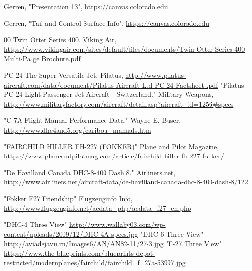 \documentclass[conf]{new-aiaa}
\begin{document}
\begin{thebibliography}{99}


 Gerren, "Presentation 13", \url{https://canvas.colorado.edu}

 Gerren, "Tail and Control Surface Info", \url{https://canvas.colorado.edu}

00%
 Twin Otter Series 400. Viking Air, 
    \url{https://www.vikingair.com/sites/default/files/documents/Twin Otter Series 400 Multi-Pa
ge Brochure.pdf}

 PC-24 The Super Versatile Jet. Pilatus, 
        \url{http://www.pilatus-aircraft.com/data/document/Pilatus-Aircraft-Ltd-PC-24-Factsheet
.pdf}
 "Pilatus PC-24 Light Passenger Jet Aircraft - Switzerland." Military Weapons, 
    \url{http://www.militaryfactory.com/aircraft/detail.asp?aircraft_id=1256#specs}

 "C-7A Flight Manual Performance Data." Wayne E. Buser, 
    \url{http://www.dhc4and5.org/caribou_manuals.htm}

 "FAIRCHILD HILLER FH-227 (FOKKER)" Plane and Pilot Magazine, 
    \url{https://www.planeandpilotmag.com/article/fairchild-hiller-fh-227-fokker/}

 "De Havilland Canada DHC-8-400 Dash 8." Airliners.net, 
    \url{http://www.airliners.net/aircraft-data/de-havilland-canada-dhc-8-400-dash-8/122}

 "Fokker F27 Friendship" Flugzeuginfo Info,
    \url{http://www.flugzeuginfo.net/acdata_php/acdata_f27_en.php}

 "DHC-4 Three View"
    \url{http://www.wallaby03.com/wp-content/uploads/2009/12/DHC-4A-specs.jpg}
 "DHC-6 Three View"
    \url{http://aviadejavu.ru/Images6/AN/AN82-11/27-3.jpg}
 "F-27 Three View"
    \url{https://www.the-blueprints.com/blueprints-depot-restricted/modernplanes/fairchild/fairchild_f_27a-53997.jpg}

\end{thebibliography}
\end{document}

